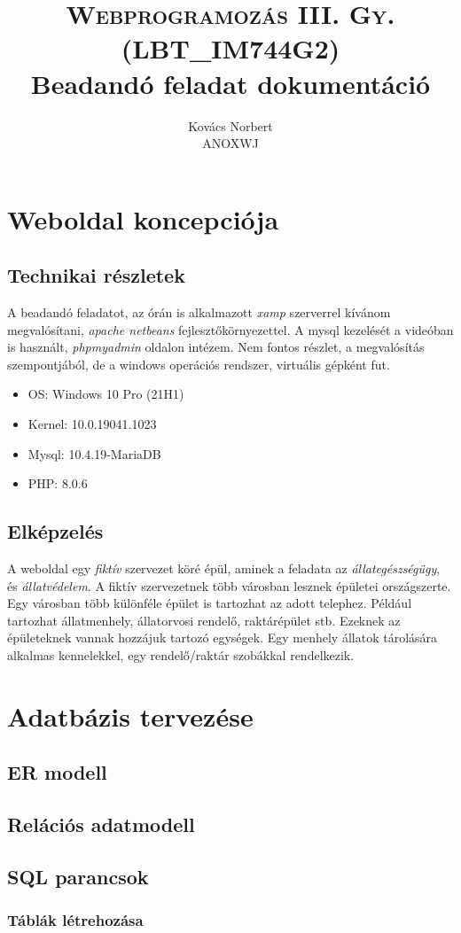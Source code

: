 \documentclass[a4paper,12pt]{article}
\begin{document}
\title{\textsc{Webprogramozás III. Gy. \\ {\normalsize (LBT\_IM744G2)}} \\ {\normalsize Beadandó feladat dokumentáció}}
\author{Kovács Norbert \\ ANOXWJ}
\maketitle
\newpage
\tableofcontents
\newpage


\section{Weboldal koncepciója}
\subsection{Technikai részletek}
A beadandó feladatot, az órán is alkalmazott \textit{xamp} szerverrel kívánom megvalósítani, \textit{apache netbeans} fejlesztőkörnyezettel. A mysql kezelését a videóban is használt, \textit{phpmyadmin} oldalon intézem. Nem fontos részlet, a megvalósítás szempontjából, de a windows operációs rendszer, virtuális gépként fut.

\begin{itemize}
	\item OS: Windows 10 Pro (21H1)
	\item Kernel: 10.0.19041.1023
	\item Mysql: 10.4.19-MariaDB
	\item PHP: 8.0.6
\end{itemize}

\subsection{Elképzelés}
A weboldal egy \textit{fiktív} szervezet köré épül, aminek a feladata  az \textit{állategészségügy}, és \textit{állatvédelem}. A fiktív szervezetnek több városban lesznek épületei országszerte. Egy városban több különféle épület is tartozhat az adott telephez. Például tartozhat állatmenhely, állatorvosi rendelő, raktárépület stb. Ezeknek az épületeknek vannak hozzájuk tartozó egységek. Egy menhely állatok tárolására alkalmas kennelekkel, egy rendelő/raktár szobákkal rendelkezik. 

\section{Adatbázis tervezése}
\subsection{ER modell}
\subsection{Relációs adatmodell}
\subsection{SQL parancsok}
\subsubsection{Táblák létrehozása}
\end{document}
